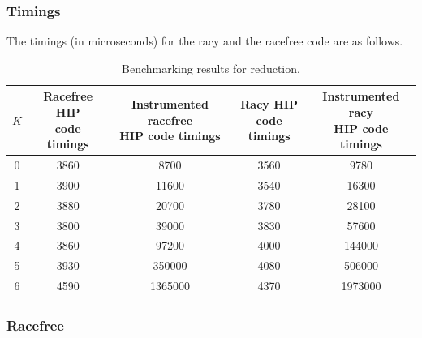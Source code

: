 \documentclass{btp}
\begin{document}
\subsubsection{Timings}

The timings (in microseconds) for the racy and the racefree code are as follows.

\begin{table}[H]
	\caption {Benchmarking results for reduction.}
	\begin{adjustbox}{center}
		{\renewcommand{\arraystretch}{1.2}
			\begin{tabular}{|c||c|c||c|c|}
				\hline
				$K$ & \makecell{Racefree HIP                            \\ code timings}  & \makecell{Instrumented racefree \\ HIP code timings}                & \makecell{Racy HIP \\ code timings} & \makecell{Instrumented racy \\ HIP code timings} \\
				\hline
				0   & 3860                   & 8700    & 3560 & 9780    \\
				\hline
				1   & 3900                   & 11600   & 3540 & 16300   \\
				\hline
				2   & 3880                   & 20700   & 3780 & 28100   \\
				\hline
				3   & 3800                   & 39000   & 3830 & 57600   \\
				\hline
				4   & 3860                   & 97200   & 4000 & 144000  \\
				\hline
				5   & 3930                   & 350000  & 4080 & 506000  \\
				\hline
				6   & 4590                   & 1365000 & 4370 & 1973000 \\
				\hline
			\end{tabular}}
	\end{adjustbox}
\end{table}

\subsubsection{Racefree}
\label{sec:racefree}
\end{document}
